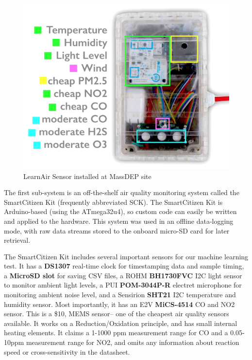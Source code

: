 \begin{figure}[htb]
 	\includegraphics[width=\textwidth]{visuals/learnairV1_labeled}               
 	 \caption{LearnAir Sensor installed at MassDEP site}
  	\label{fig:learnairv1_labeled}
\end{figure}

The first sub-system is an off-the-shelf air quality monitoring system called the SmartCitizen Kit (frequently abbreviated SCK). \cite{sck}  The SmartCitizen Kit is Arduino-based (using the ATmega32u4), so custom code can easily be written and applied to the hardware.  This system was used in an offline data-logging mode, with raw data streams stored to the onboard micro-SD card for later retrieval.  

The SmartCitizen Kit includes several important sensors for our machine learning test.  It has a \textbf{DS1307} real-time clock for timestamping data and sample timing, a \textbf{MicroSD slot} for saving CSV files, a ROHM \textbf{BH1730FVC} I2C light sensor to monitor ambient light levels, a PUI \textbf{POM-3044P-R} electret microphone for monitoring ambient noise level, and a Sensirion \textbf{SHT21} I2C temperature and humidity sensor.  Most importantly, it has an E2V \textbf{MiCS-4514} CO and NO2 sensor.  This is a \$10, MEMS sensor-- one of the cheapest air quality sensors available.  It works on a Reduction/Oxidation principle, and has small internal heating elements.  It claims a 1-1000 ppm measurement range for CO and a 0.05-10ppm measurement range for NO2, and omits any information about reaction speed or cross-sensitivity in the datasheet.

